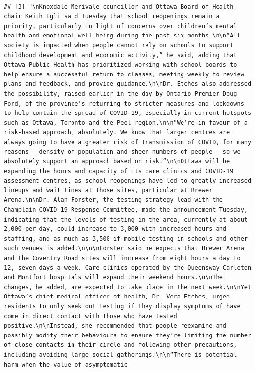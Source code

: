 \documentclass[]{article}
\begin{document}
\begin{verbatim}
                                                                                                                                                                                                                                                                                                                                                                                                                                                                                                                                                                                                                                                                                                                                                                                                                                
## [3] "\nKnoxdale-Merivale councillor and Ottawa Board of Health chair Keith Egli said Tuesday that school reopenings remain a priority, particularly in light of concerns over children’s mental health and emotional well-being during the past six months.\n\n“All society is impacted when people cannot rely on schools to support childhood development and economic activity,” he said, adding that Ottawa Public Health has prioritized working with school boards to help ensure a successful return to classes, meeting weekly to review plans and feedback, and provide guidance.\n\nDr. Etches also addressed the possibility, raised earlier in the day by Ontario Premier Doug Ford, of the province’s returning to stricter measures and lockdowns to help contain the spread of COVID-19, especially in current hotspots such as Ottawa, Toronto and the Peel region.\n\n“We’re in favour of a risk-based approach, absolutely. We know that larger centres are always going to have a greater risk of transmission of COVID, for many reasons — density of population and sheer numbers of people — so we absolutely support an approach based on risk.”\n\nOttawa will be expanding the hours and capacity of its care clinics and COVID-19 assessment centres, as school reopenings have led to greatly increased lineups and wait times at those sites, particular at Brewer Arena.\n\nDr. Alan Forster, the testing strategy lead with the Champlain COVID-19 Response Committee, made the announcement Tuesday, indicating that the levels of testing in the area, currently at about 2,000 per day, could increase to 3,000 with increased hours and staffing, and as much as 3,500 if mobile testing in schools and other such venues is added.\n\n\nForster said he expects that Brewer Arena and the Coventry Road sites will increase from eight hours a day to 12, seven days a week. Care clinics operated by the Queensway-Carleton and Montfort hospitals will expand their weekend hours.\n\nThe changes, he added, are expected to take place in the next week.\n\nYet Ottawa’s chief medical officer of health, Dr. Vera Etches, urged residents to only seek out testing if they display symptoms of have come in direct contact with those who have tested positive.\n\nInstead, she recommended that people reexamine and possibly modify their behaviours to ensure they’re limiting the number of close contacts in their circle and following other precautions, including avoiding large social gatherings.\n\n“There is potential harm when the value of asymptomatic 
\end{verbatim}
\end{document}
